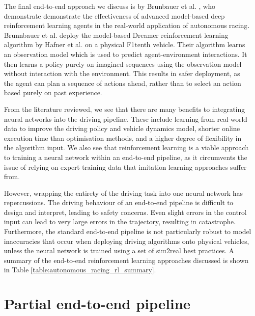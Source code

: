 The final end-to-end approach we discuss is by Brunbauer et al. \cite{brunnbauer2021}, who demonstrate demonstrate the effectiveness of advanced model-based deep reinforcement learning agents in the real-world application of autonomous racing.
Brunnbauer et al. \cite{brunnbauer2021} deploy the model-based Dreamer reinforcement learning algorithm by Hafner et al. \cite{Hafner2019a} on a physical F1tenth vehicle.
Their algorithm learns an observation model which is used to predict agent-environment interactions.
It then learns a policy purely on imagined sequences using the observation model without interaction with the environment.
This results in safer deployment, as the agent can plan a sequence of actions ahead, rather than to select an action based purely on past experience.

From the literature reviewed, we see that there are many benefits to integrating neural networks into the driving pipeline.
These include learning from real-world data to improve the driving policy and vehicle dynamics model, shorter online execution time than optimisation methods, and a higher degree of flexibility in the algorithm input.
We also see that reinforcement learning is a viable approach to training a neural network within an end-to-end pipeline, as it circumvents the issue of relying on expert training data that imitation learning approaches suffer from.

However, wrapping the entirety of the driving task into one neural network has repercussions.
The driving behaviour of an end-to-end pipeline is difficult to design and interpret, leading to safety concerns.
Even slight errors in the control input can lead to very large errors in the trajectory, resulting in catastrophe.
Furthermore, the standard end-to-end pipeline is not particularly robust to model inaccuracies that occur when deploying driving algorithms onto physical vehicles, unless the neural network is trained using a set of sim2real best practices.
A summary of the end-to-end reinforcement learning approaches discussed is shown in Table \ref{table:autonomous_racing_rl_summary}.



\section{Partial end-to-end pipeline}
\label{sec:partial_end_to_end}


